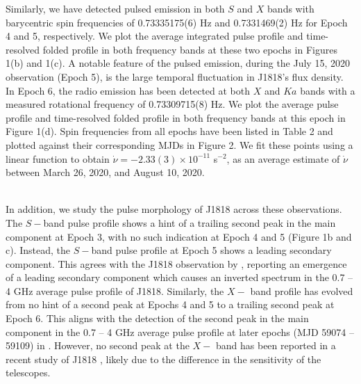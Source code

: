 \documentclass[twocolumn]{emulateapj}
\begin{document}
Similarly, we have detected pulsed emission in both $S$ and $X$ bands with barycentric spin frequencies of 0.73335175(6) Hz and 0.7331469(2) Hz for Epoch 4 and 5, respectively. We plot the average integrated pulse profile and time-resolved folded profile in both frequency bands at these two epochs in Figures 1(b) and 1(c). A notable feature of the pulsed emission, during the July 15, 2020 observation (Epoch 5), is the large temporal fluctuation in J1818's flux density. In Epoch 6, the radio emission has been detected at both $X$ and $Ka$ bands with a measured rotational frequency of 0.73309715(8) Hz. We plot the average pulse profile and time-resolved folded profile in both frequency bands at this epoch in Figure 1(d). Spin frequencies from all epochs have been listed in Table 2 and plotted against their corresponding MJDs in Figure 2. We fit these points using a linear function to obtain $\dot{\nu} = -2.33(3) \times 10^{-11} $ s$^{-2}$, as an average estimate of $\dot{\nu}$ between March 26, 2020, and August 10, 2020.\\ 

In addition, we study the pulse morphology of J1818 across these observations. The $S-$band pulse profile shows a hint of a trailing second peak in the main component at Epoch 3, with no such indication at Epoch 4 and 5 (Figure 1b and c). Instead, the $S-$band pulse profile at Epoch 5 shows a leading secondary component. This agrees with the J1818 observation by \cite{marcus2020b}, reporting an emergence of a leading secondary component which causes an inverted spectrum in the 0.7 -- 4 GHz average pulse profile of J1818. Similarly, the $X-$ band profile has evolved from no hint of a second peak at Epochs 4 and 5 to a trailing second peak at Epoch 6. This aligns with the detection of the second peak in the main component in the 0.7 -- 4 GHz average pulse profile at later epochs (MJD 59074 -- 59109) in \cite{marcus2020b}. However, no second peak at the $X-$ band has been reported in a recent study of J1818 \citep{Huang2021}, likely due to the difference in the sensitivity of the telescopes. %
 

\end{document}
